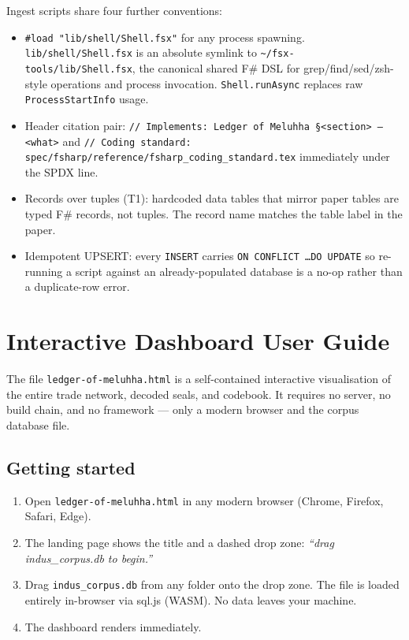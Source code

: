 Ingest scripts share four further conventions:

\begin{itemize}[nosep]
\item \texttt{\#load "lib/shell/Shell.fsx"} for any process
  spawning. \texttt{lib/shell/Shell.fsx} is an absolute symlink to
  \texttt{\textasciitilde{}/fsx-tools/lib/Shell.fsx}, the canonical
  shared F\# DSL for grep/find/sed/zsh-style operations and
  process invocation. \texttt{Shell.runAsync} replaces raw
  \texttt{ProcessStartInfo} usage.
\item Header citation pair: \texttt{// Implements: Ledger of
  Meluhha §<section> --- <what>} and
  \texttt{// Coding standard: spec/fsharp/reference/fsharp\_coding\_standard.tex}
  immediately under the SPDX line.
\item Records over tuples (T1): hardcoded data tables that mirror
  paper tables are typed F\# records, not tuples. The record name
  matches the table label in the paper.
\item Idempotent UPSERT: every \texttt{INSERT} carries
  \texttt{ON CONFLICT \ldots DO UPDATE} so re-running a script
  against an already-populated database is a no-op rather than a
  duplicate-row error.
\end{itemize}

\clearpage
\section{Interactive Dashboard User Guide}\label{sec:dashboard}

The file \texttt{ledger-of-meluhha.html} is a self-contained
interactive visualisation of the entire trade network, decoded
seals, and codebook. It requires no server, no build chain, and no
framework --- only a modern browser and the corpus database file.

\subsection{Getting started}

\begin{enumerate}
\item Open \texttt{ledger-of-meluhha.html} in any modern browser
  (Chrome, Firefox, Safari, Edge).
\item The landing page shows the title and a dashed drop zone:
  \textit{``drag indus\_corpus.db to begin.''}
\item Drag \texttt{indus\_corpus.db} from any folder onto the drop
  zone. The file is loaded entirely in-browser via sql.js (WASM).
  No data leaves your machine.
\item The dashboard renders immediately.
\end{enumerate}

